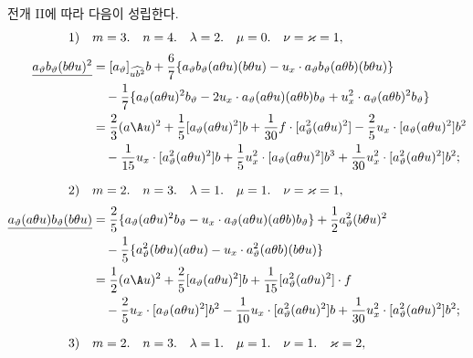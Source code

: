 
전개 II에 따라 다음이 성립한다.
\[
\begin{aligned}
\text{1)}\quad&m=3.\quad n=4.\quad \lambda=2.\quad \mu=0.\quad \nu=\varkappa=1,\\[0.25em]
\underline{a_\vartheta b_\vartheta(b\theta u)^2}
&=[a_\vartheta]_{\widehat{ub^2}}b+\frac67\{a_\vartheta b_\vartheta(a\theta u)(b\theta u)-u_x\cdot a_\vartheta b_\vartheta(a\theta b)(b\theta u)\}\\
&\quad-\frac17\{a_\vartheta(a\theta u)^2b_\vartheta-2u_x\cdot a_\vartheta(a\theta u)(a\theta b)b_\vartheta+u_x^2\cdot a_\vartheta(a\theta b)^2b_\vartheta\}\\
&=\frac23(a\A u)^2+\frac15[a_\vartheta(a\theta u)^2]b+\frac1{30}f\cdot[a_\vartheta^2(a\theta u)^2]-\frac25u_x\cdot[a_\vartheta(a\theta u)^2]b^2\\
&\quad-\frac1{15}u_x\cdot[a_\vartheta^2(a\theta u)^2]b+\frac15u_x^2\cdot[a_\vartheta(a\theta u)^2]b^3+\frac1{30}u_x^2\cdot[a_\vartheta^2(a\theta u)^2]b^2;\\[0.7em]
\text{2)}\quad&m=2.\quad n=3.\quad \lambda=1.\quad \mu=1.\quad \nu=\varkappa=1,\\[0.25em]
\underline{a_\vartheta(a\theta u)b_\vartheta(b\theta u)}
&=\frac25\{a_\vartheta(a\theta u)^2b_\vartheta-u_x\cdot a_\vartheta(a\theta u)(a\theta b)b_\vartheta\}+\frac12a_\vartheta^2(b\theta u)^2\\
&\quad-\frac15\{a_\vartheta^2(b\theta u)(a\theta u)-u_x\cdot a_\vartheta^2(a\theta b)(b\theta u)\}\\
&=\frac12(a\A u)^2+\frac25[a_\vartheta(a\theta u)^2]b+\frac1{15}[a_\vartheta^2(a\theta u)^2]\cdot f\\
&\quad-\frac25u_x\cdot[a_\vartheta(a\theta u)^2]b^2-\frac1{10}u_x\cdot[a_\vartheta^2(a\theta u)^2]b+\frac1{30}u_x^2\cdot[a_\vartheta^2(a\theta u)^2]b^2;\\[0.7em]
\text{3)}\quad&m=2.\quad n=3.\quad \lambda=1.\quad \mu=1.\quad \nu=1.\quad \varkappa=2,
\end{aligned}
\]
